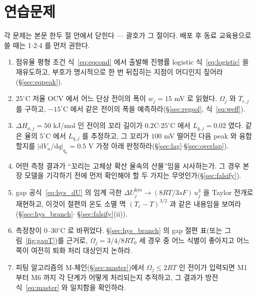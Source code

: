 \documentclass[11pt,a4paper]{article}
\newcommand{\dd}{\mathrm{d}}
\newcommand{\hys}{\mathrm{hys}}
\begin{document}
\section{연습문제}\label{sec:exercises}
각 문제는 본문 한두 절 안에서 닫힌다 — 괄호가 그 절이다. 배포 후 동료 교육용으로 쓸 때는 1$\cdot$2$\cdot$4
를 먼저 권한다.
\begin{enumerate}[label=\textbf{\arabic*.},leftmargin=2.0em,itemsep=3pt]
\item 점유율 평형 조건 식~\eqref{eq:eqcond} 에서 출발해 진행률 logistic 식~\eqref{eq:logistic} 을 재유도하고,
  부호가 명시적으로 한 번 뒤집히는 지점이 어디인지 짚어라(\S\ref{sec:eqpeak}).
\item $25^\circ$C 저율 OCV 에서 어느 단상 전이의 폭이 $w_j=15$ mV 로 읽혔다. $\Omega_j$ 와 $T_{c,j}$ 를
  구하고, $-15^\circ$C 에서 같은 전이의 폭을 예측하라(\S\ref{sec:regsol}, 식~\eqref{eq:weff}).
\item $\Delta H_{a,j}=50$ kJ/mol 인 전이의 꼬리 길이가 $0.2$C$\cdot$$25^\circ$C 에서 $L_{q,j}=0.02$ 였다.
  같은 율의 $5^\circ$C 에서 $L_{q,j}$ 를 추정하고, 그 꼬리가 $100$ mV 떨어진 다음 peak 와 융합할지를
  $|\dd V_n/\dd q|_{q_a}=0.5$ V 가정 아래 판정하라(\S\ref{sec:lag}$\cdot$\S\ref{sec:overlap}).
\item 어떤 측정 결과가 ``꼬리는 고체상 확산 율속의 산물''임을 시사하는가. 그 경우 본 장 모델을 기각하기 전에
  먼저 확인해야 할 두 가지는 무엇인가(\S\ref{sec:falsify}).
\item gap 공식~\eqref{eq:hys_dU} 의 임계 극한 $\Delta U_j^\hys\to(8RT/3sF)\,u_j^3$ 을 Taylor 전개로 재현하고,
  이것이 절편의 온도 소멸 멱 $(T_{c}-T)^{3/2}$ 과 같은 내용임을 보여라(\S\ref{sec:hys_branch}$\cdot$
  \S\ref{sec:falsify}(ii)).
\item 측정창이 $0$--$30^\circ$C 로 바뀌었다. \S\ref{sec:hys_branch} 의 gap 절편 표(또는
  그림~\ref{fig:gapT})를 근거로, $\Omega_j=3/4/8RT_0$ 세 경우 중 어느 식별이 좋아지고 어느 쪽이 여전히
  퇴화 처리 대상인지 논하라.
\item 피팅 알고리즘의 M-체인(\S\ref{sec:master})에서 $\Omega_j\le2RT$ 인 전이가 입력되면 M1 부터 M6 까지
  각 단계가 어떻게 처리되는지 추적하고, 그 결과가 방전식~\eqref{eq:master} 와 일치함을 확인하라.
\end{enumerate}
\end{document}
